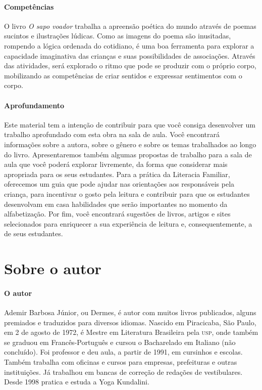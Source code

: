 \documentclass[11pt]{extarticle}
\begin{document}
\paragraph{Competências}
O livro \textit{O sapo voador} trabalha a apreensão poética do mundo através de poemas sucintos e ilustrações lúdicas. Como as imagens do poema são inusitadas, rompendo a lógica ordenada do cotidiano, é uma boa ferramenta para explorar a capacidade imaginativa das crianças e suas possibilidades de associações. Através das atividades, será explorado o ritmo que pode se produzir com o próprio corpo, mobilizando as competências de criar sentidos e expressar sentimentos com o corpo.


\paragraph{Aprofundamento} Este material tem a 
intenção de contribuir para que você consiga desenvolver um trabalho aprofundado 
com esta obra na sala de aula. Você encontrará informações sobre a autora, sobre 
o gênero e sobre os temas trabalhados ao longo do livro. Apresentaremos também 
algumas propostas de trabalho para a sala de aula que você poderá explorar livremente, 
da forma que considerar mais apropriada para os seus estudantes. Para a prática 
da Literacia Familiar, oferecemos um guia que pode ajudar nas orientações aos 
responsáveis pela criança, para incentivar o gosto pela leitura e contribuir para 
que os estudantes desenvolvam em casa habilidades que serão importantes no momento 
da alfabetização. Por fim, você encontrará sugestões de livros, artigos e sites 
selecionados para enriquecer a sua experiência de leitura e, 
consequentemente, a de seus estudantes.



\section{Sobre o autor}

\paragraph{O autor} Ademir Barbosa Júnior, ou Dermes, é autor com muitos livros publicados, alguns premiados e traduzidos para diversos idiomas. Nascido em Piracicaba, São Paulo, em 2 de agosto de 1972, é Mestre em Literatura Brasileira pela \textsc{usp}, onde também se graduou em Francês-Português e cursou o Bacharelado em Italiano (não concluído). 
Foi professor e deu aula, a partir de 1991, em cursinhos e escolas. Também trabalha com oficinas e cursos para empresas, prefeituras e outras instituições. Já trabalhou em bancas de correção de redações de vestibulares. Desde 1998 pratica e estuda a Yoga Kundalini.
\end{document}
